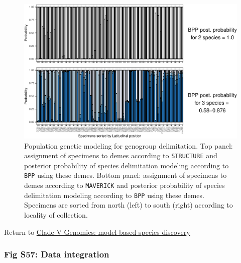\documentclass[
  11pt,
]{article}
\begin{document}
\begin{figure}
\includegraphics{Supplementary_Material_files/figure-latex/cladeVmolecularDelimitationPopGenBpp-1} \caption{Population genetic modeling for genogroup delimitation. Top panel: assignment of specimens to demes according to \texttt{STRUCTURE} and posterior probability of species delimitation modeling according to \texttt{BPP} using these demes. Bottom panel: assignment of specimens to demes according to \texttt{MAVERICK} and posterior probability of species delimitation modeling according to \texttt{BPP} using these demes. Specimens are sorted from north (left) to south (right) according to locality of collection.}\label{fig:cladeVmolecularDelimitationPopGenBpp}
\end{figure}

Return to \protect\hyperlink{model-based-species-discovery-9}{Clade V Genomics: model-based species discovery}
\pagebreak

\hypertarget{fig-s57-data-integration}{%
\subsubsection{Fig S57: Data integration}\label{fig-s57-data-integration}}
\end{document}
